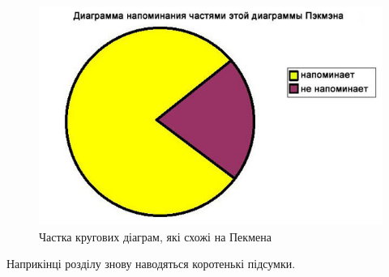 {\begin{figure}[ht]
        \centering
        \includegraphics[scale=0.5]{Images/Pacman.jpg}
        \caption{Частка кругових діаграм, які схожі на Пекмена}
        \label{fig_pacman}
\end{figure}
}



\chapconclude{\ref{chap:theory}}

Наприкінці розділу знову наводяться коротенькі підсумки.
